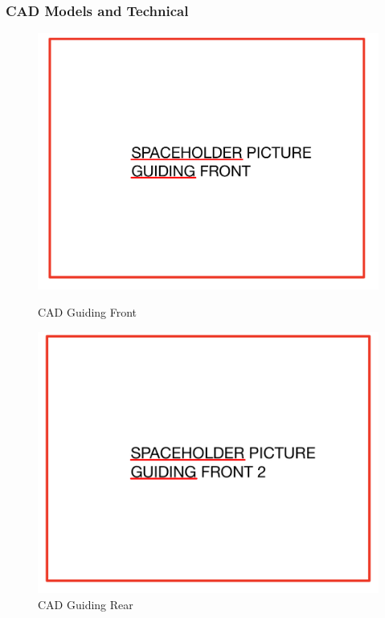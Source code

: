 \subsubsection{CAD Models and Technical }
\begin{figure}[!ht]
  \centering
  \begin{minipage}[b]{0.45\linewidth}
    \includegraphics[width=\linewidth]{guiding_front_1.jpg}
    \caption{CAD Guiding Front}
    \label{fig:guiding_front}
  \end{minipage}
  \hspace{0.5cm}
  \begin{minipage}[b]{0.45\linewidth}
    \includegraphics[width=\linewidth]{guiding_front_2.jpg}
    \caption{CAD Guiding Rear}
    \label{fig:guiding_rear}
  \end{minipage}
\end{figure}

